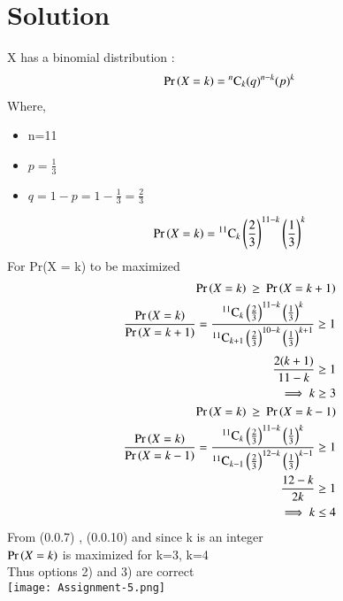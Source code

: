 \documentclass[journal,12pt,twocolumn]{IEEEtran}
\begin{document}
\section*{Solution}
X has a binomial distribution :
\begin{align}
\Pr\left(X=k\right) = {{}^{n}\mathrm{C}_{k}}(q)^{n-k}(p)^{k}
\end{align}
Where,
\begin{itemize}
\item n=11
\item $p=\frac{1}{3}$
\item $q=1-p=1-\frac{1}{3}=\frac{2}{3}$
\end{itemize}
\begin{align}
\Pr\left(X = k\right)={{}^{11}\mathrm{C}_{k}}\left(\frac{2}{3}\right)^{11-k}\left(\frac{1}{3}\right)^{k}
\end{align}
For Pr(X = k) to be maximized
\begin{align}
\Pr\left(X = k\right)\:\geq\:\Pr\left(X = k+1\right)\\
\frac{\Pr\left(X = k\right)}{\Pr\left(X = k+1\right)}=\frac{{{}^{11}\mathrm{C}_{k}}\left(\frac{2}{3}\right)^{11-k}\left(\frac{1}{3}\right)^{k}}{{{}^{11}\mathrm{C}_{k+1}}\left(\frac{2}{3}\right)^{10-k}\left(\frac{1}{3}\right)^{k+1}}\geq1
\end{align}
\begin{align}
\frac{2(k+1)}{11-k}\geq1\\
\implies k\geq3\\
\Pr\left(X = k\right)\:\geq\:\Pr\left(X = k-1\right)\\
\frac{\Pr\left(X = k\right)}{\Pr\left(X = k-1\right)}=\frac{{{}^{11}\mathrm{C}_{k}}\left(\frac{2}{3}\right)^{11-k}\left(\frac{1}{3}\right)^{k}}{{{}^{11}\mathrm{C}_{k-1}}\left(\frac{2}{3}\right)^{12-k}\left(\frac{1}{3}\right)^{k-1}}\geq1\\
\frac{12-k}{2k}\geq1\\
\implies k\leq4
\end{align}
From (0.0.7) , (0.0.10) and since k is an integer\\
$\Pr\left(X = k\right)$ is maximized for k=3, k=4\\
Thus options 2) and 3) are correct\\
\newline
\texttt{[image: Assignment-5.png]}
\end{document}
